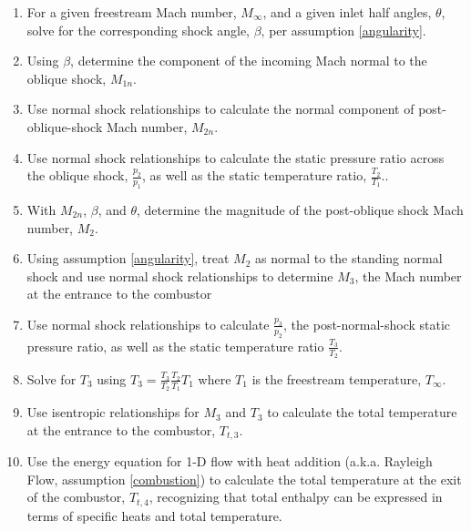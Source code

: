\documentclass[../main.tex]{subfiles}
\begin{document}
\begin{enumerate}

    \item For a given freestream Mach number, \(M_\infty\), and a given inlet half angles, \(\theta\), solve for the corresponding shock angle, \(\beta\), per assumption \ref{angularity}. 

    \item Using \(\beta\), determine the component of the incoming Mach normal to the oblique shock, \(M_{1n}\).
    
    \item Use normal shock relationships to calculate the normal component of post-oblique-shock Mach number, \(M_{2n}\).
    
    \item Use normal shock relationships to calculate the static pressure ratio across the oblique shock, \(\frac{p_2}{p_1}\), as well as the static temperature ratio, \(\frac{T_2}{T_1}\)..
    
    \item With \(M_{2n}\), \(\beta\), and \(\theta\), determine the magnitude of the post-oblique shock Mach number, \(M_2\).
    
    \item Using assumption \ref{angularity}, treat \(M_2\) as normal to the standing normal shock and use normal shock relationships to determine \(M_3\), the Mach number at the entrance to the combustor
    
    \item Use normal shock relationships to calculate \(\frac{p_3}{p_2}\), the post-normal-shock static pressure ratio, as well as the static temperature ratio \(\frac{T_3}{T_2}\).

    \item Solve for \(T_3\) using \(T_3 = \frac{T_3}{T_2} \frac{T_2}{T_1} T_1\) where \(T_1\) is the freestream temperature, \(T_\infty\).

    \item Use isentropic relationships for \(M_3\) and \(T_3\) to calculate the total temperature at the entrance to the combustor, \(T_{t,3}\).
    
    \item Use the energy equation for 1-D flow with heat addition (a.k.a. Rayleigh Flow, assumption \ref{combustion}) to calculate the total temperature at the exit of the combustor, \(T_{t,4}\), recognizing that total enthalpy can be expressed in terms of specific heats and total temperature.


\end{enumerate}
\end{document}
